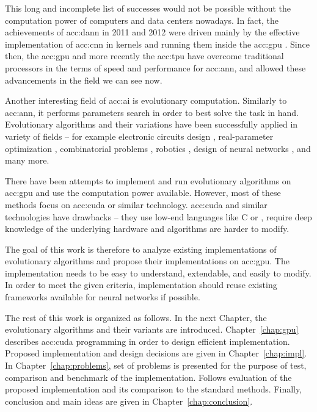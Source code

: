 This long and incomplete list of successes would not be possible without the computation power of computers and data centers nowadays. In fact, the achievements of \acrshort{acc:dann} in 2011 and 2012 were driven mainly by the effective implementation of \acrfull{acc:cnn} in kernels and running them inside the \acrfull{acc:gpu} \citep{CIRESAN2012333}. Since then, the \acrshort{acc:gpu} and more recently the \acrfull{acc:tpu} have overcome traditional processors in the terms of speed and performance for \acrshort{acc:ann}, and allowed these advancements in the field we can see now.

Another interesting field of \acrlong{acc:ai} is evolutionary computation. Similarly to \acrshort{acc:ann}, it performs parameters search in order to best solve the task in hand. Evolutionary algorithms and their variations have been successfully applied in variety of fields -- for example 
electronic circuits design \citep{NASAantenaDesign}\allowbreak\citep{circuitdesignoptimizationea},
real-parameter optimization \citep{IntroNaturalEvolutionStrategies}, 
combinatorial problems \citep{GeneticAssambleLineBalancingProblem}\allowbreak\citep{ALBAYRAK20111313},\linebreak
robotics \citep{EvolutionaryRobotics}\allowbreak\citep{RoboticsInPhysX}\allowbreak\citep{nygaard2018realworld},
design of neural networks \citep{NEAT}\allowbreak\citep{Floreano2008NeuroevolutionFA},
and many more.

There have been attempts to implement and run evolutionary algorithms on \acrshort{acc:gpu} \citep{CHENG2019514} and use the computation power available. However, most of these methods focus on \acrfull{acc:cuda} or similar technology. \acrshort{acc:cuda} and similar technologies have drawbacks -- they use low-end languages like C or \cpp, require deep knowledge of the underlying hardware and algorithms are harder to modify.

The goal of this work is therefore to analyze existing implementations of evolutionary algorithms and propose their implementations on \acrshort{acc:gpu}. The implementation needs to be easy to understand, extendable, and easily to modify. In order to meet the given criteria, implementation should reuse existing frameworks available for neural networks if possible.

The rest of this work is organized as follows. 
In the next Chapter, the evolutionary algorithms and their variants are introduced. 
Chapter~\ref{chap:gpu} describes \acrshort{acc:cuda} programming in order to  design efficient implementation.
Proposed implementation and design decisions are given in Chapter~\ref{chap:impl}. 
In Chapter~\ref{chap:problems}, set of problems is presented for the purpose of test, comparison and benchmark of the implementation. Follows evaluation of the proposed implementation and its comparison to the standard methods.
Finally, conclusion and main ideas are given in Chapter~\ref{chap:conclusion}.
